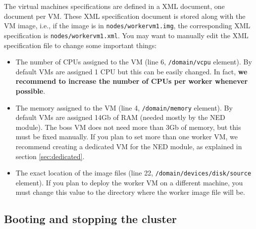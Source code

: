 \documentclass[a4]{article}
\begin{document}
The virtual machines specifications are defined in a XML document, one
document per VM. These XML specification document is stored along with the
VM image, i.e., if the image is in \texttt{nodes/workervm1.img}, the
corresponding XML specification is \texttt{nodes/workervm1.xml}. You may
want to manually edit the XML specification file to change some important
things:
\begin{itemize}
\item The number of CPUs assigned to the VM (line 6, \texttt{/domain/vcpu}
  element). By default VMs are assigned 1 CPU but this can be easily
  changed. In fact, \textbf{we recommend to increase the number of CPUs per
    worker whenever possible}.
\item The memory assigned to the VM (line 4, \texttt{/domain/memory}
  element). By default VMs are assigned 14Gb of RAM (needed mostly by
  the NED module). The boss VM does not need more than 3Gb of memory,
  but this must be fixed manually. If you plan to set more than one
  worker VM, we recommend creating a dedicated VM for the NED module,
  as explained in section \ref{sec:dedicated}.
\item The exact location of the image files (line 22,
  \texttt{/domain/devices/disk/source} element). If you plan to deploy the
  worker VM on a different machine, you must change this value to
  the directory where the worker image file will be.
\end{itemize}





\subsection{Booting and stopping the cluster}
\label{sec:boot-stopp-clust}
\end{document}
